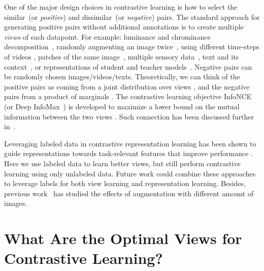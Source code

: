 \documentclass{article}
\begin{document}
One of the major design choices in contrastive learning is how to select the similar~(or \emph{positive}) and dissimilar~(or \emph{negative}) pairs. The standard approach for generating positive pairs without additional annotations is to create multiple \emph{views} of each datapoint. For example: luminance and chrominance decomposition~\cite{tian2019contrastive}, randomly augmenting an image twice~\cite{wu2018unsupervised,chen2020simple,bachman2019learning,he2019momentum,ye2019unsupervised,srinivas2020curl,zhao2020distilling,zhuang2019local}, using different time-steps of videos \cite{oord2018representation,zhuang2019unsupervised,sermanet2018time,han2019video,gordon2020watching},  patches of the same image~\cite{isola2016cooccurrence,oord2018representation,hjelm2018learning}, multiple sensory data~\cite{morgado2020audio,chung2019perfect,patrick2020multi}, text and its context~\cite{mikolov2013distributed,yang2019xlnet,logeswaran2018efficient,Kong2020A}, or representations of student and teacher models~\cite{Tian2020Contrastive}. Negative pairs can be randomly chosen images/videos/texts. 
Theoretically, we can think of the positive pairs as coming from a joint distribution over views , and the negative pairs from a product of marginals . The contrastive learning objective InfoNCE~\cite{oord2018representation} (or Deep InfoMax~\cite{hjelm2018learning}) is developed to maximize a lower bound on the mutual information between the two views . Such connection has been discussed further in~\cite{poole2019variational,tschannen2019mutual}.

Leveraging labeled data in contrastive representation learning has been shown to guide representations towards task-relevant features that improve performance \cite{zhai2019s4l,henaff2019data,khosla2020supervised,wu2018improving}. Here we use labeled data to learn better views, but still perform contrastive learning using only unlabeled data. Future work could combine these approaches to leverage labels for both view learning and representation learning. Besides, previous work~\cite{asano2019critical} has studied the effects of augmentation with different amount of images.




 


\section{What Are the Optimal Views for Contrastive Learning?}
\end{document}
